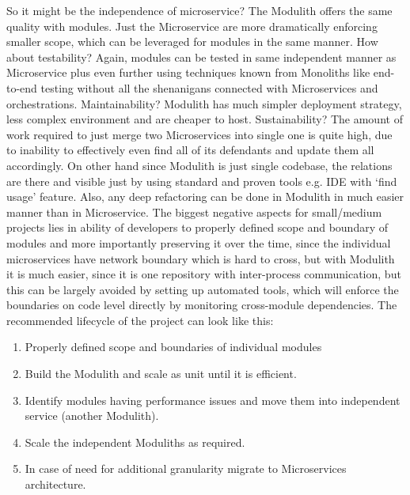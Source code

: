 So it might be the independence of microservice? The Modulith offers the same quality with modules. Just the Microservice are more dramatically enforcing smaller scope, which can be leveraged for modules in the same manner. How about testability? Again, modules can be tested in same independent manner as Microservice plus even further using techniques known from Monoliths like end-to-end testing without all the shenanigans connected with Microservices and orchestrations. Maintainability? Modulith has much simpler deployment strategy, less complex environment and are cheaper to host. Sustainability? The amount of work required to just merge two Microservices into single one is quite high, due to inability to effectively even find all of its defendants and update them all accordingly. On other hand since Modulith is just single codebase, the relations are there and visible just by using standard and proven tools e.g. IDE with `find usage' feature. Also, any deep refactoring can be done in Modulith in much easier manner than in Microservice. The biggest negative aspects for small/medium projects lies in ability of developers to properly defined scope and boundary of modules and more importantly preserving it over the time, since the individual microservices have network boundary which is hard to cross, but with Modulith it is much easier, since it is one repository with inter-process communication, but this can be largely avoided by setting up automated tools, which will enforce the boundaries on code level directly by monitoring cross-module dependencies. The recommended lifecycle of the project can look like this:


\begin{enumerate}
    \item Properly defined scope and boundaries of individual modules
    \item Build the Modulith and scale as unit until it is efficient.
    \item Identify modules having performance issues and move them into independent service (another Modulith).
    \item Scale the independent Moduliths as required.
    \item In case of need for additional granularity migrate to Microservices architecture.
\end{enumerate}



